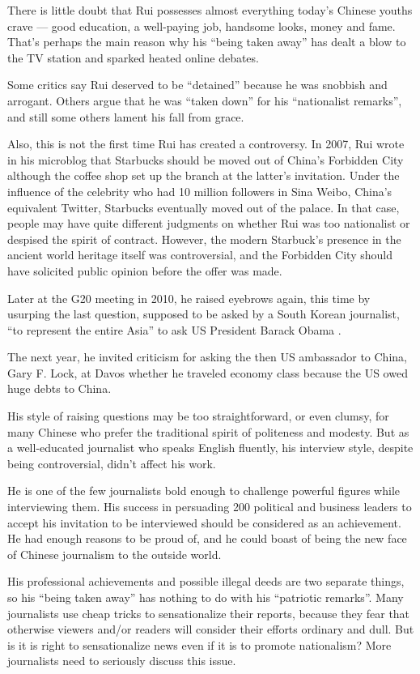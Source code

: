 \begin{displayquote}
	There is little doubt that Rui possesses almost everything today's
	Chinese youths crave — good education, a well-paying job, handsome
	looks, money and fame. That's perhaps the main reason why his ``being
	taken away'' has dealt a blow to the TV station and sparked heated
	online debates.

	Some critics say Rui deserved to be ``detained'' because he was snobbish
	and arrogant. Others argue that he was ``taken down'' for his
	``nationalist remarks'', and still some others lament his fall from
	grace.

	Also, this is not the first time Rui has created a controversy. In 2007,
	Rui wrote in his microblog that Starbucks should be moved out of China's
	Forbidden City although the coffee shop set up the branch at the
	latter's invitation.  Under the influence of the celebrity who had 10
	million followers in Sina Weibo, China's equivalent Twitter, Starbucks
	eventually moved out of the palace. In that case, people may have quite
	different judgments on whether Rui was too nationalist or despised the
	spirit of contract. However, the modern Starbuck's presence in the
	ancient world heritage itself was controversial, and the Forbidden City
	should have solicited public opinion before the offer was made.

	Later at the G20 meeting in 2010, he raised eyebrows again, this time by
	usurping the last question, supposed to be asked by a South Korean
	journalist, ``to represent the entire Asia'' to ask US President Barack
	Obama .

	The next year, he invited criticism for asking the then US ambassador to
	China, Gary F. Lock, at Davos whether he traveled economy class because
	the US owed huge debts to China.

	His style of raising questions may be too straightforward, or even
	clumsy, for many Chinese who prefer the traditional spirit of politeness
	and modesty. But as a well-educated journalist who speaks English
	fluently, his interview style, despite being controversial, didn't
	affect his work.

	He is one of the few journalists bold enough to challenge powerful
	figures while interviewing them. His success in persuading 200 political
	and business leaders to accept his invitation to be interviewed should
	be considered as an achievement. He had enough reasons to be proud of,
	and he could boast of being the new face of Chinese journalism to the
	outside world.

	His professional achievements and possible illegal deeds are two
	separate things, so his “being taken away” has nothing to do with his
	``patriotic remarks''. Many journalists use cheap tricks to sensationalize
	their reports, because they fear that otherwise viewers and/or readers
	will consider their efforts ordinary and dull. But is it is right to
	sensationalize news even if it is to promote nationalism? More
	journalists need to seriously discuss this issue.


\end{displayquote}
